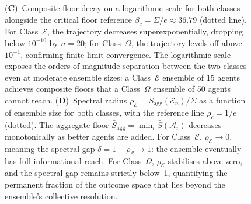\begin{figure}[!htbp]
{    (\textbf{C})~Composite floor decay on a logarithmic scale for both classes alongside the critical floor reference $\beta_c = \Sigma/e \approx 36.79$ (dotted line).  For Class~$\mathcal{E}$, the trajectory decreases superexponentially, dropping below $10^{-10}$ by $n = 20$; for Class~$\Omega$, the trajectory levels off above $10^{-1}$, confirming finite-limit convergence.  The logarithmic scale exposes the orders-of-magnitude separation between the two classes even at moderate ensemble sizes: a Class~$\mathcal{E}$ ensemble of 15 agents achieves composite floors that a Class~$\Omega$ ensemble of 50 agents cannot reach.
    (\textbf{D})~Spectral radius $\rho_\mathcal{E} = \bar{S}_{\mathrm{agg}}(\mathcal{E}_n) / \Sigma$ as a function of ensemble size for both classes, with the reference line $\rho_c = 1/e$ (dotted).  The aggregate floor $\bar{S}_{\mathrm{agg}} = \min_i \bar{S}(\mathcal{A}_i)$ decreases monotonically as better agents are added.  For Class~$\mathcal{E}$, $\rho_\mathcal{E} \to 0$, meaning the spectral gap $\delta = 1 - \rho_\mathcal{E} \to 1$: the ensemble eventually has full informational reach.  For Class~$\Omega$, $\rho_\mathcal{E}$ stabilises above zero, and the spectral gap remains strictly below~1, quantifying the permanent fraction of the outcome space that lies beyond the ensemble's collective resolution.}
    \label{fig:het_panel_2}
\end{figure}

